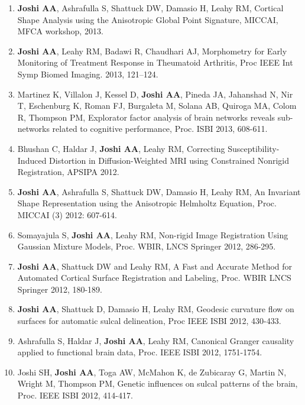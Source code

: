 \documentclass[overlapped,line,letterpaper]{res}
\begin{document}
\begin{resume}
\begin{enumerate}
    \item \textbf{Joshi AA}, Ashrafulla S, Shattuck DW, Damasio H, Leahy RM, {Cortical Shape Analysis using the Anisotropic Global Point Signature}, MICCAI, MFCA workshop, 2013.
 
    \item \textbf{Joshi AA}, Leahy RM, Badawi R, Chaudhari AJ, {Morphometry for Early Monitoring of Treatment Response in Theumatoid Arthritis}, Proc IEEE Int Symp Biomed Imaging. 2013, 121–124. 

    \item Martinez K, Villalon J, Kessel D, \textbf{Joshi AA}, Pineda JA, Jahanshad N, Nir T, Eschenburg K, Roman FJ, Burgaleta M, Solana AB, Quiroga MA, Colom R, Thompson PM, {Explorator factor analysis of brain networks reveals sub-networks related to cognitive performance}, Proc. ISBI 2013, 608-611.

    \item Bhushan C, Haldar J, \textbf{Joshi AA}, Leahy RM, {Correcting Susceptibility-Induced Distortion in Diffusion-Weighted MRI using Constrained Nonrigid Registration}, APSIPA 2012. 

    \item \textbf{Joshi AA}, Ashrafulla S, Shattuck DW, Damasio H, Leahy RM, {An Invariant Shape Representation using the Anisotropic Helmholtz Equation}, Proc. MICCAI (3) 2012: 607-614.

    \item Somayajula S, \textbf{Joshi AA}, Leahy RM, {Non-rigid Image Registration Using Gaussian Mixture Models}, Proc. WBIR, LNCS Springer 2012, 286-295. 

    \item \textbf{Joshi AA}, Shattuck DW and Leahy RM, {A Fast and Accurate Method for Automated Cortical Surface Registration and Labeling}, Proc. WBIR LNCS Springer 2012, 180-189.

    \item \textbf{Joshi AA}, Shattuck D, Damasio H, Leahy RM, {Geodesic curvature flow on surfaces for automatic sulcal delineation}, Proc IEEE ISBI 2012, 430-433.

    \item Ashrafulla S, Haldar J, \textbf{Joshi AA}, Leahy RM, {Canonical Granger causality applied to functional brain data}, Proc. IEEE ISBI 2012, 1751-1754.

    \item Joshi SH, \textbf{Joshi AA}, Toga AW, McMahon K, de Zubicaray G, Martin N, Wright M, Thompson PM, {Genetic influences on sulcal patterns of the brain}, Proc. IEEE ISBI 2012, 414-417.


\end{enumerate}
\end{resume}
\end{document}
